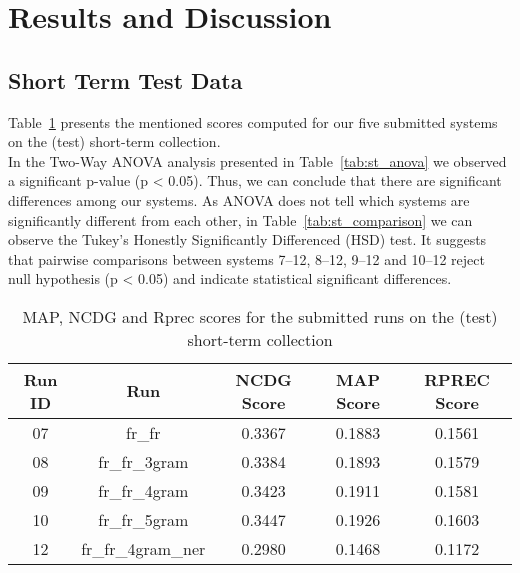 \newpage
\section{Results and Discussion}
\label{sec:results}

\subsection{Short Term Test Data}\label{subsec:short_term}

Table~\ref{tab:st_scores} presents the mentioned scores computed for our five submitted systems on the (test)
short-term collection.\\

In the Two-Way ANOVA analysis presented in Table~\ref{tab:st_anova} we observed a significant p-value (p < 0.05).
Thus, we can conclude that there are significant differences among our systems.
As ANOVA does not tell which systems are significantly different from each other, in Table~\ref{tab:st_comparison} we
can observe the Tukey’s Honestly Significantly Differenced (HSD) test.
It suggests that pairwise comparisons between systems 7--12, 8--12, 9--12 and 10--12 reject null hypothesis (p < 0.05)
and indicate statistical significant differences.

\begin{table}[h!]
    \begin{center}
        \caption{MAP, NCDG and Rprec scores for the submitted runs on the (test) short-term collection}
        \label{tab:st_scores}
        \begin{tabular}{|c|c||c|c|c|}
            \hline
            \textbf{Run ID} & \textbf{Run} & \textbf{NCDG Score} & \textbf{MAP Score} & \textbf{RPREC Score}\\
            \hline\hline
            07 & fr\_fr & 0.3367 & 0.1883 & 0.1561 \\
            \hline
            08 & fr\_fr\_3gram & 0.3384 & 0.1893 & 0.1579 \\
            \hline
            09 & fr\_fr\_4gram & 0.3423 & 0.1911 & 0.1581 \\
            \hline
            10 & fr\_fr\_5gram & 0.3447 & 0.1926 & 0.1603 \\
            \hline
            12 & fr\_fr\_4gram\_ner & 0.2980 & 0.1468 & 0.1172 \\
            \hline
        \end{tabular}
    \end{center}
\end{table}

